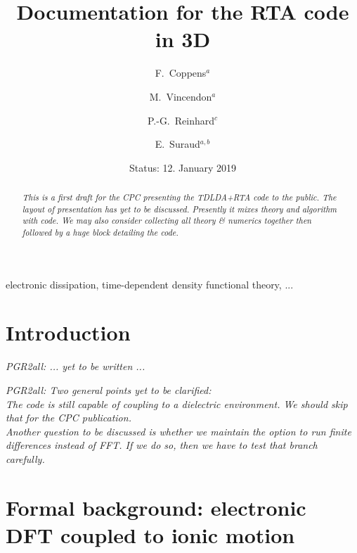 \documentclass[final,1p]{elsarticle}
\newcommand{\PGR}[1]{{\color{blue} #1}}
\newcommand{\PGRcomm}[1]{{\color{blue}\small\em PGR2all: #1}}
\begin{document}
\begin{frontmatter}

\title{Documentation for the RTA code in 3D}

\author{F.~Coppens$^a$}
\author{M.~Vincendon$^a$}
\author{P.-G.~Reinhard$^c$}
\author{E.~Suraud$^{a,b}$}
\address{$^a$Universit\'e de Toulouse; UPS; Laboratoire de Physique
             Th\'{e}orique, IRSAMC; F-31062 Toulouse Cedex, France}
\address{$^b$Laboratoire de Physique Th\'eorique, Universit\'e Paul
  Sabatier, CNRS, F-31062 Toulouse C\'edex, France}
\address{$^c$Institut f{\"u}r Theoretische Physik, Universit{\"a}t
  Erlangen, D-91058 Erlangen, Germany}

\date{Status: 12. January 2019}
\begin{abstract}
\PGR{\em This is a first draft for the CPC presenting the TDLDA+RTA code
  to the public. The layout of presentation has yet to be discussed.
Presently it mixes theory and algorithm with code. We may also
consider collecting all theory \& numerics together then followed by a
huge block detailing the code.}
\end{abstract}

\begin{keyword}
electronic dissipation, time-dependent
density functional theory, ...
\end{keyword}
\end{frontmatter}

\section{Introduction}

\PGRcomm{... yet to be written ...}


\noindent
\PGRcomm{Two general points yet to be clarified:
\\
The code is still capable of coupling to a dielectric
  environment. We should skip that for the CPC publication.
\\
Another question to be discussed is whether we maintain the option to
run finite differences instead of FFT. If we do so, then we have to
test that branch carefully.
}


\section{Formal background: electronic DFT coupled to ionic motion}
\label{sec:TDLDA}
\end{document}
